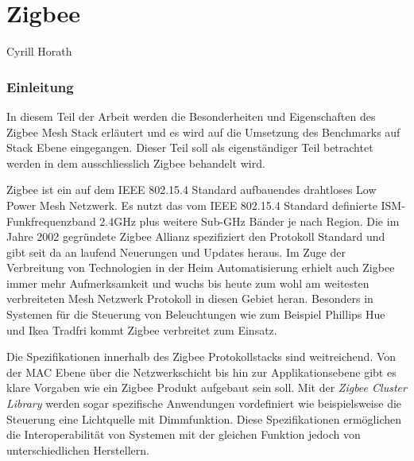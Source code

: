 \vspace*{4cm}
\part{Zigbee}\label{part:Zigbee}
Cyrill Horath
\vspace*{\fill}
\clearpage

\section{Einleitung}\label{sec:EinleitungZigbee}

In diesem Teil der Arbeit werden die Besonderheiten und Eigenschaften des Zigbee Mesh Stack erläutert und es wird auf die Umsetzung des Benchmarks auf Stack Ebene eingegangen. Dieser Teil soll als eigenständiger Teil betrachtet werden in dem ausschliesslich Zigbee behandelt wird.

Zigbee ist ein auf dem IEEE 802.15.4 Standard aufbauendes drahtloses Low Power Mesh Netzwerk. Es nutzt das vom IEEE 802.15.4 Standard definierte ISM-Funkfrequenzband 2.4GHz plus weitere Sub-GHz Bänder je nach Region.
Die im Jahre 2002 gegründete Zigbee Allianz spezifiziert den Protokoll Standard und gibt seit da an laufend Neuerungen und Updates heraus.
Im Zuge der Verbreitung von Technologien in der Heim Automatisierung erhielt auch Zigbee immer mehr Aufmerksamkeit und wuchs bis heute zum wohl am weitesten verbreiteten Mesh Netzwerk Protokoll in diesen Gebiet heran. Besonders in Systemen für die Steuerung von Beleuchtungen wie zum Beispiel Phillips Hue und Ikea Tradfri kommt Zigbee verbreitet zum Einsatz.

Die Spezifikationen innerhalb des Zigbee Protokollstacks sind weitreichend. Von der MAC Ebene über die Netzwerkschicht bis hin zur Applikationsebene gibt es klare Vorgaben wie ein Zigbee Produkt aufgebaut sein soll.
Mit der \textit{Zigbee Cluster Library} werden sogar spezifische Anwendungen vordefiniert wie beispielsweise die Steuerung eine Lichtquelle mit Dimmfunktion.
Diese Spezifikationen ermöglichen die Interoperabilität von Systemen mit der gleichen Funktion jedoch von unterschiedlichen Herstellern.




